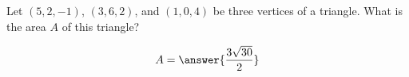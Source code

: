 \documentclass{ximera}
\author{Gregory Hartman \and Matthew Carr}
\begin{document}
\begin{exercise}
Let $(5,2,-1)$, $(3,6,2)$, and $(1,0,4)$ be three vertices of a triangle. What is the area $A$ of this triangle?
\begin{prompt}
\[
A=\answer{\frac{3\sqrt{30}}{2}}
\]
\end{prompt}


\end{exercise}
\end{document}
